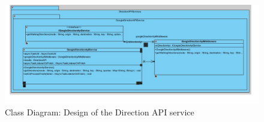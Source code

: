         \par
        \begin{figure}[htbp!]
            \centering \includegraphics[scale=0.6]{grafiken/directionService.jpg}
            \caption{Class Diagram: Design of the Direction API service}
            \label{fig:directionServiceClassDiagram}
        \end{figure}